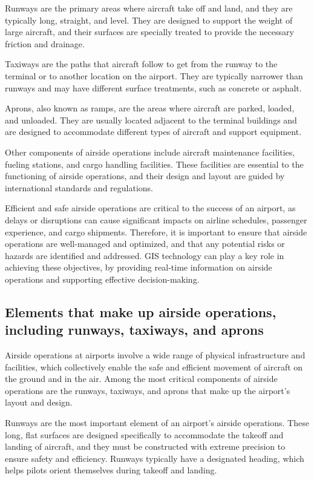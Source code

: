     Runways are the primary areas where aircraft take off and land, and they are typically long, straight, and level. They are designed to support the weight of large aircraft, and their surfaces are specially treated to provide the necessary friction and drainage.

    Taxiways are the paths that aircraft follow to get from the runway to the terminal or to another location on the airport. They are typically narrower than runways and may have different surface treatments, such as concrete or asphalt.

    Aprons, also known as ramps, are the areas where aircraft are parked, loaded, and unloaded. They are usually located adjacent to the terminal buildings and are designed to accommodate different types of aircraft and support equipment.

    Other components of airside operations include aircraft maintenance facilities, fueling stations, and cargo handling facilities. These facilities are essential to the functioning of airside operations, and their design and layout are guided by international standards and regulations.

    Efficient and safe airside operations are critical to the success of an airport, as delays or disruptions can cause significant impacts on airline schedules, passenger experience, and cargo shipments. Therefore, it is important to ensure that airside operations are well-managed and optimized, and that any potential risks or hazards are identified and addressed. GIS technology can play a key role in achieving these objectives, by providing real-time information on airside operations and supporting effective decision-making.

    \subsection{Elements that make up airside operations, including runways, taxiways, and aprons}

    Airside operations at airports involve a wide range of physical infrastructure and facilities, which collectively enable the safe and efficient movement of aircraft on the ground and in the air. Among the most critical components of airside operations are the runways, taxiways, and aprons that make up the airport's layout and design.

    Runways are the most important element of an airport's airside operations. These long, flat surfaces are designed specifically to accommodate the takeoff and landing of aircraft, and they must be constructed with extreme precision to ensure safety and efficiency. Runways typically have a designated heading, which helps pilots orient themselves during takeoff and landing.

